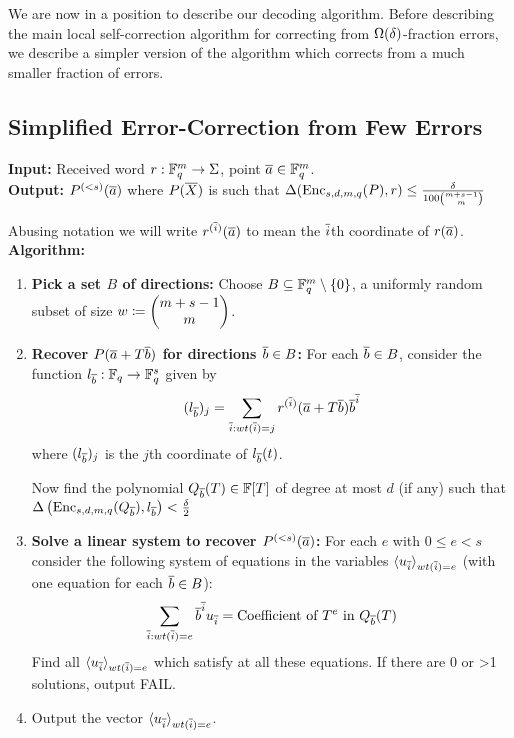 We are now in a position to describe our decoding algorithm. Before describing the main local self-correction algorithm for correcting from $\Omega(\delta)$-fraction errors, we describe a simpler version of the algorithm which corrects from a much smaller fraction of errors.
\subsection{Simplified Error-Correction from Few Errors}
\textbf{Input:} Received word $r:\mathbb{F}_q^m\to \Sigma$, point $\overline{a}\in \mathbb{F}_q^m$. \\
\textbf{Output:} $P^{(<s)}(\overline{a})$ where $P(\overline{X})$ is such that $\Delta(\operatorname{Enc}_{s,d,m,q}(P),r)\leq \frac{\delta}{100{{m+s-1}\choose{m}}}$

Abusing notation we will write $r^{(\overline{i})}(\overline{a})$ to mean the $\overline{i}$th coordinate of $r(\overline{a})$.\\
\textbf{Algorithm:}\begin{enumerate}
	\item \textbf{Pick a set $B$ of directions:} Choose $B\subseteq \mathbb{F}_q^m\setminus \{0\}$, a uniformly random subset of size $w\coloneqq \left(\begin{matrix} m+s-1\\ m \end{matrix}\right)$. 
	\item \textbf{Recover $P(\overline{a}+T\overline{b})$ for directions $\overline{b}\in B$:} For each $\overline{b}\in B$, consider the function $l_{\overline{b}}:\mathbb{F}_q\to \mathbb{F}_q^s$ given by $$(l_{\overline{b}})_j=\sum_{\overline{i}:wt(\overline{i})=j}r^{(\overline{i})}(\overline{a}+T\overline{b})\overline{b}^{\overline{i}}$$ where $(l_{\overline{b}})_j$ is the $j$th coordinate of $l_{\overline{b}}(t)$. 
	
	Now find the polynomial $Q_{\overline{b}}(T)\in \mathbb{F}[T]$ of degree at most $d$ (if any) such that $\Delta\left(\operatorname{Enc}_{s,d,m,q}(Q_{\overline{b}}),l_{\overline{b}}\right)<\frac{\delta}2$
	\item \textbf{Solve a linear system to recover $P^{(<s)}(\overline{a})$:} For each $e$ with $0\leq e<s$ consider the following system of equations in the variables $\langle u_{\overline{i}}\rangle_{wt(\overline{i})=e}$ (with one equation for each $\overline{b}\in B$): $$\sum_{\overline{i}:wt(\overline{i})=e}\overline{b}^{\overline{i}}u_{\overline{i}}=\text{Coefficient of $T^e$ in $Q_{\overline{b}}(T)$}$$Find all $\langle u_{\overline{i}}\rangle_{wt(\overline{i})=e}$ which satisfy at all these equations. If there are 0 or >1 solutions, output FAIL.
	\item Output the vector $\langle u_{\overline{i}}\rangle_{wt(\overline{i})=e}$.
\end{enumerate}
